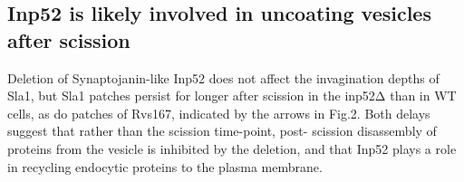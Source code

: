 \subsection{Inp52 is likely involved in uncoating vesicles after scission}
Deletion of Synaptojanin-like Inp52 does not affect the invagination depths of Sla1, but Sla1 patches persist for longer after scission in the inp52Δ than in WT cells, as do patches of Rvs167, indicated by the arrows in Fig.2. Both delays suggest that rather than the scission time-point, post- scission disassembly of proteins from the vesicle is inhibited by the deletion, and that Inp52 plays a role in recycling endocytic proteins to the plasma membrane.






